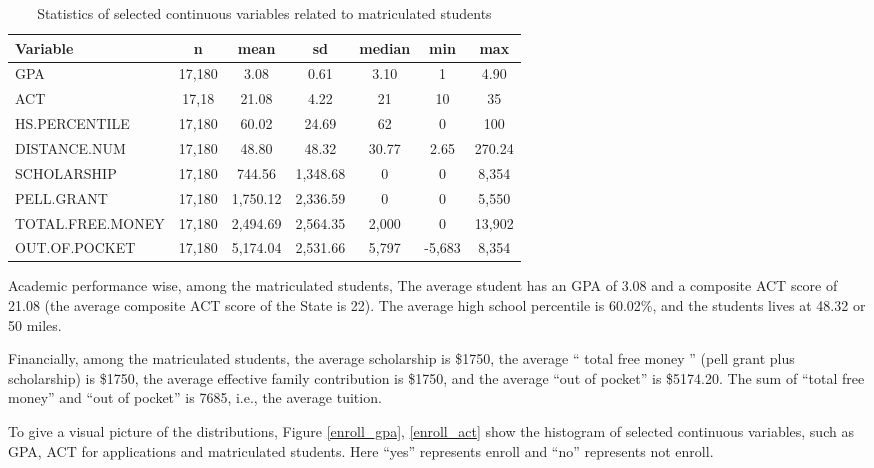\documentclass[12pt,english]{report}
\begin{document}
\begin{table}[H]
\centering
\begin{tabular}{|l|cccccc|} \hline \hline
Variable         & n        & mean        & sd          & median   & min         & max       \\ \hline
GPA              & 17,180 & 3.08     & 0.61     & 3.10  & 1         & 4.90   \\
ACT              & 17,18 & 21.08    & 4.22     & 21     & 10        & 35      \\
HS.PERCENTILE    & 17,180 & 60.02    & 24.69    & 62     & 0         & 100     \\
DISTANCE.NUM     & 17,180 & 48.80    & 48.32    & 30.77 & 2.65     & 270.24 \\\hline
SCHOLARSHIP      & 17,180 & 744.56   & 1,348.68 & 0      & 0         & 8,354   \\
PELL.GRANT       & 17,180 & 1,750.12 & 2,336.59 & 0      & 0         & 5,550   \\
TOTAL.FREE.MONEY & 17,180 & 2,494.69 & 2,564.35 & 2,000  & 0         & 13,902  \\ 
OUT.OF.POCKET  & 17,180 & 5,174.04 & 2,531.66 & 5,797  & -5,683 & 8,354   \\ \hline \hline
\end{tabular}
\caption{Statistics of selected continuous variables related to matriculated students }
\label{continuous_matriculated}
\end{table}
Academic performance wise, among the matriculated students, The average student has an GPA of 3.08 and a composite ACT score of 21.08 (the average composite ACT score of the State is 22). The average high school percentile is 60.02\%, and the students lives at 48.32 or 50 miles. 

Financially, among the matriculated students, the average scholarship is \$1750, the average `` total free money '' (pell grant plus scholarship) is \$1750, the average effective family contribution is \$1750, and the average ``out of pocket'' is \$5174.20.  The sum of ``total free money'' and ``out of pocket'' is 7685, i.e., the average tuition. 

To give a visual picture of the distributions,  Figure \ref{enroll_gpa}, \ref{enroll_act} show the histogram of selected continuous variables, such as GPA, ACT for applications and matriculated students. Here ``yes'' represents enroll and ``no'' represents not enroll. 
\end{document}
